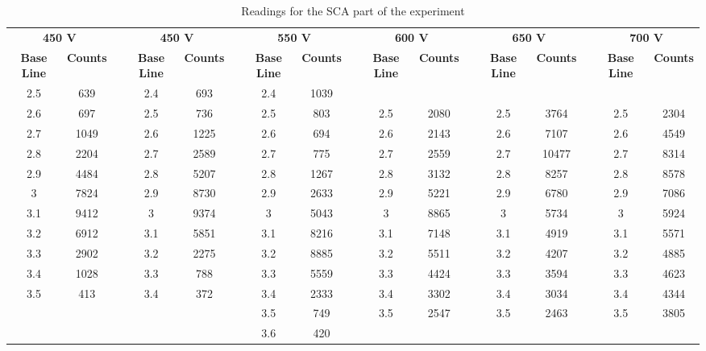 \documentclass[%
 reprint,
nofootinbib,
 amsmath,amssymb,
 aps,
floatfix,
]{revtex4-2}
\begin{document}
\begin{table}[]
\caption{Readings for the SCA part of the experiment}
\label{tab:my-table}
\begin{tabular}{@{}ccccccccccccccccc@{}}
\toprule
\multicolumn{2}{c}{\textbf{450   V}} &  & \multicolumn{2}{c}{\textbf{450 V}} &  & \multicolumn{2}{c}{\textbf{550 V}} &  & \multicolumn{2}{c}{\textbf{600 V}} &  & \multicolumn{2}{c}{\textbf{650 V}} &  & \multicolumn{2}{c}{\textbf{700 V}} \\ \cmidrule(r){1-2} \cmidrule(lr){4-5} \cmidrule(lr){7-8} \cmidrule(lr){10-11} \cmidrule(lr){13-14} \cmidrule(l){16-17} 
\textbf{Base Line} & \textbf{Counts} &  & \textbf{Base Line} & \textbf{Counts} &  & \textbf{Base Line} & \textbf{Counts} &  & \textbf{Base Line} & \textbf{Counts} &  & \textbf{Base Line} & \textbf{Counts} &  & \textbf{Base Line} & \textbf{Counts} \\ \midrule
2.5 & 639 &  & 2.4 & 693 &  & 2.4 & 1039 &  &  &  &  &  &  &  &  &  \\
2.6 & 697 &  & 2.5 & 736 &  & 2.5 & 803 &  & 2.5 & 2080 &  & 2.5 & 3764 &  & 2.5 & 2304 \\
2.7 & 1049 &  & 2.6 & 1225 &  & 2.6 & 694 &  & 2.6 & 2143 &  & 2.6 & 7107 &  & 2.6 & 4549 \\
2.8 & 2204 &  & 2.7 & 2589 &  & 2.7 & 775 &  & 2.7 & 2559 &  & 2.7 & 10477 &  & 2.7 & 8314 \\
2.9 & 4484 &  & 2.8 & 5207 &  & 2.8 & 1267 &  & 2.8 & 3132 &  & 2.8 & 8257 &  & 2.8 & 8578 \\
3 & 7824 &  & 2.9 & 8730 &  & 2.9 & 2633 &  & 2.9 & 5221 &  & 2.9 & 6780 &  & 2.9 & 7086 \\
3.1 & 9412 &  & 3 & 9374 &  & 3 & 5043 &  & 3 & 8865 &  & 3 & 5734 &  & 3 & 5924 \\
3.2 & 6912 &  & 3.1 & 5851 &  & 3.1 & 8216 &  & 3.1 & 7148 &  & 3.1 & 4919 &  & 3.1 & 5571 \\
3.3 & 2902 &  & 3.2 & 2275 &  & 3.2 & 8885 &  & 3.2 & 5511 &  & 3.2 & 4207 &  & 3.2 & 4885 \\
3.4 & 1028 &  & 3.3 & 788 &  & 3.3 & 5559 &  & 3.3 & 4424 &  & 3.3 & 3594 &  & 3.3 & 4623 \\
3.5 & 413 &  & 3.4 & 372 &  & 3.4 & 2333 &  & 3.4 & 3302 &  & 3.4 & 3034 &  & 3.4 & 4344 \\
 &  &  &  &  &  & 3.5 & 749 &  & 3.5 & 2547 &  & 3.5 & 2463 &  & 3.5 & 3805 \\
 &  &  &  &  &  & 3.6 & 420 &  &  &  &  &  &  &  &  &  \\ \bottomrule
\end{tabular}
\end{table}
\end{document}
